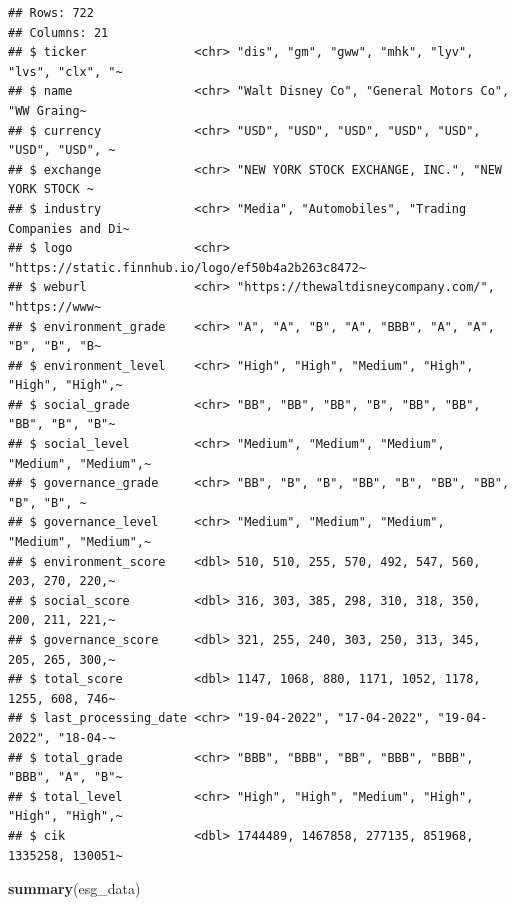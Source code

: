 \documentclass[
]{article}
\newenvironment{Shaded}{\begin{snugshade}}{\end{snugshade}}
\newcommand{\FunctionTok}[1]{\textcolor[rgb]{0.13,0.29,0.53}{\textbf{#1}}}
\newcommand{\NormalTok}[1]{#1}
\begin{document}
\begin{verbatim}
## Rows: 722
## Columns: 21
## $ ticker               <chr> "dis", "gm", "gww", "mhk", "lyv", "lvs", "clx", "~
## $ name                 <chr> "Walt Disney Co", "General Motors Co", "WW Graing~
## $ currency             <chr> "USD", "USD", "USD", "USD", "USD", "USD", "USD", ~
## $ exchange             <chr> "NEW YORK STOCK EXCHANGE, INC.", "NEW YORK STOCK ~
## $ industry             <chr> "Media", "Automobiles", "Trading Companies and Di~
## $ logo                 <chr> "https://static.finnhub.io/logo/ef50b4a2b263c8472~
## $ weburl               <chr> "https://thewaltdisneycompany.com/", "https://www~
## $ environment_grade    <chr> "A", "A", "B", "A", "BBB", "A", "A", "B", "B", "B~
## $ environment_level    <chr> "High", "High", "Medium", "High", "High", "High",~
## $ social_grade         <chr> "BB", "BB", "BB", "B", "BB", "BB", "BB", "B", "B"~
## $ social_level         <chr> "Medium", "Medium", "Medium", "Medium", "Medium",~
## $ governance_grade     <chr> "BB", "B", "B", "BB", "B", "BB", "BB", "B", "B", ~
## $ governance_level     <chr> "Medium", "Medium", "Medium", "Medium", "Medium",~
## $ environment_score    <dbl> 510, 510, 255, 570, 492, 547, 560, 203, 270, 220,~
## $ social_score         <dbl> 316, 303, 385, 298, 310, 318, 350, 200, 211, 221,~
## $ governance_score     <dbl> 321, 255, 240, 303, 250, 313, 345, 205, 265, 300,~
## $ total_score          <dbl> 1147, 1068, 880, 1171, 1052, 1178, 1255, 608, 746~
## $ last_processing_date <chr> "19-04-2022", "17-04-2022", "19-04-2022", "18-04-~
## $ total_grade          <chr> "BBB", "BBB", "BB", "BBB", "BBB", "BBB", "A", "B"~
## $ total_level          <chr> "High", "High", "Medium", "High", "High", "High",~
## $ cik                  <dbl> 1744489, 1467858, 277135, 851968, 1335258, 130051~
\end{verbatim}

\begin{Shaded}
\begin{Highlighting}[]
\FunctionTok{summary}\NormalTok{(esg\_data)}
\end{Highlighting}
\end{Shaded}
\end{document}
